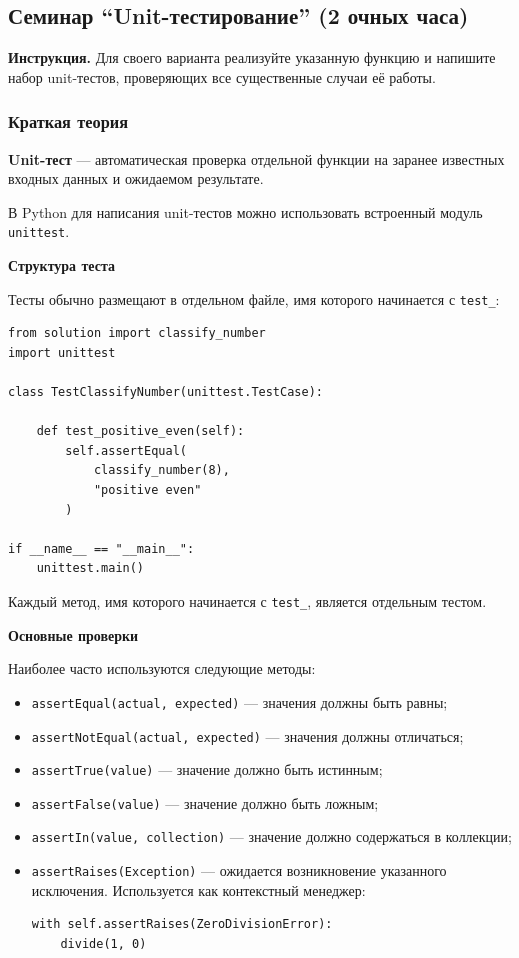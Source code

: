 \subsection{Семинар ``Unit-тестирование'' (2 очных часа)}

\textbf{Инструкция.}
Для своего варианта реализуйте указанную функцию и напишите набор
unit-тестов, проверяющих все существенные случаи её работы.

\subsubsection{Краткая теория}

\textbf{Unit-тест} --- автоматическая проверка отдельной функции на заранее
известных входных данных и ожидаемом результате.

В Python для написания unit-тестов можно использовать встроенный модуль
\texttt{unittest}.

\textbf{Структура теста}

Тесты обычно размещают в отдельном файле, имя которого начинается с
\texttt{test\_}:

\begin{verbatim}
from solution import classify_number
import unittest

class TestClassifyNumber(unittest.TestCase):

    def test_positive_even(self):
        self.assertEqual(
            classify_number(8),
            "positive even"
        )

if __name__ == "__main__":
    unittest.main()
\end{verbatim}

Каждый метод, имя которого начинается с \texttt{test\_}, является отдельным
тестом.

\textbf{Основные проверки}

Наиболее часто используются следующие методы:

\begin{itemize}
\item \texttt{assertEqual(actual, expected)} --- значения должны быть равны;
\item \texttt{assertNotEqual(actual, expected)} --- значения должны отличаться;
\item \texttt{assertTrue(value)} --- значение должно быть истинным;
\item \texttt{assertFalse(value)} --- значение должно быть ложным;
\item \texttt{assertIn(value, collection)} --- значение должно содержаться
в коллекции;
\item \texttt{assertRaises(Exception)} --- ожидается возникновение
указанного исключения. Используется как контекстный менеджер:
\begin{verbatim}
with self.assertRaises(ZeroDivisionError):
    divide(1, 0)
\end{verbatim}
\end{itemize}

